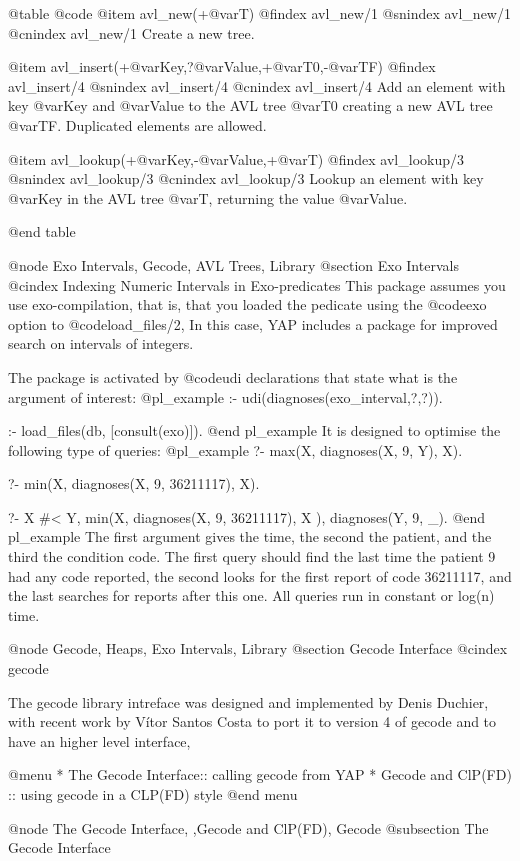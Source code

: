 @table @code
@item avl_new(+@var{T})
@findex avl_new/1
@snindex avl_new/1
@cnindex avl_new/1
Create a new tree.

@item avl_insert(+@var{Key},?@var{Value},+@var{T0},-@var{TF})
@findex avl_insert/4
@snindex avl_insert/4
@cnindex avl_insert/4
Add an element with key @var{Key} and @var{Value} to the AVL tree
@var{T0} creating a new AVL tree @var{TF}. Duplicated elements are
allowed.

@item avl_lookup(+@var{Key},-@var{Value},+@var{T})
@findex avl_lookup/3
@snindex avl_lookup/3
@cnindex avl_lookup/3
Lookup an element with key @var{Key} in the AVL tree
@var{T}, returning the value @var{Value}.

@end table

@node Exo Intervals, Gecode, AVL Trees, Library
@section Exo Intervals
@cindex Indexing Numeric Intervals in Exo-predicates
This package assumes you use exo-compilation, that is, that you loaded
the pedicate using the @code{exo} option to @code{load_files/2}, In this
case, YAP includes a package for improved search on  intervals of
integers.

The package is activated by @code{udi} declarations that state what is
the argument of interest:
@pl_example
:- udi(diagnoses(exo_interval,?,?)).

:- load_files(db, [consult(exo)]).
@end pl_example
It is designed to optimise the following type of queries:
@pl_example
?- max(X, diagnoses(X, 9, Y), X).

?- min(X, diagnoses(X, 9, 36211117), X).

?- X #< Y, min(X, diagnoses(X, 9, 36211117), X ), diagnoses(Y, 9, _).
@end pl_example
The first argument gives the time, the second the patient, and the
third the condition code. The first query should find the last time
the patient 9 had any code reported, the second looks for the first
report of code 36211117, and the last searches for reports after this
one. All queries run in  constant or log(n) time.

@node Gecode, Heaps, Exo Intervals, Library
@section Gecode Interface
@cindex gecode

The gecode library intreface was designed and implemented by Denis
Duchier, with recent work by Vítor Santos Costa to port it to version 4
of gecode and to have an higher level interface,

@menu
* The Gecode Interface:: calling gecode from YAP
* Gecode and ClP(FD) :: using gecode in a CLP(FD) style
@end menu

@node The Gecode Interface, ,Gecode and ClP(FD), Gecode
@subsection The Gecode Interface


